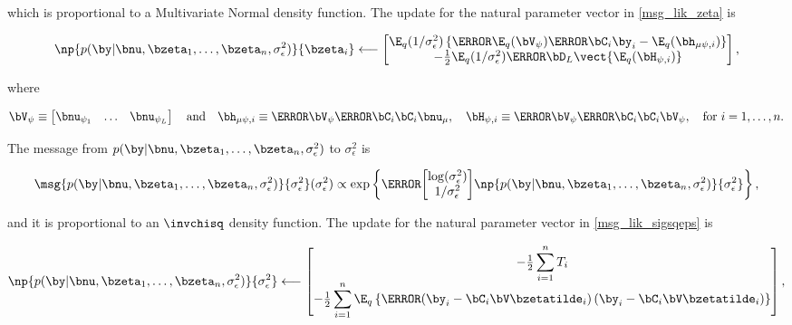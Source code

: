 \documentclass[12pt]{article}
\def\sigsqeps{\sigma^2_{\epsilon}}
\def\numu{\bnu_\mu}
\def\Vpsi{\bV_\psi}
\newcommand\nupsi[1]{\bnu_{\psi_{#1}}}
\newcommand\hmupsi[1]{\bh_{\mu \psi, i}}
\newcommand\Hpsi[1]{\bH_{\psi, i}}
\theoremstyle{plain}
\theoremstyle{definition}
\theoremstyle{remark}
\begin{document}
\noindent which is proportional to a Multivariate Normal density function.
The update for the natural parameter vector in \eqref{msg_lik_zeta} is

\begin{equation}
	\np{p (\by | \bnu, \bzeta_1, \dots, \bzeta_n, \sigsqeps)}{\bzeta_i}
		\longleftarrow
			\begin{bmatrix}
				\E_q (1/\sigsqeps) \left\{
					\T{\E_q (\Vpsi)} \T{\bC_i} \by_i - \E_q (\hmupsi{i})
				\right\} \\
				-\frac12 \E_q (1/\sigsqeps) \T{\bD_L} \vect \{ \E_q (\Hpsi{i}) \}
			\end{bmatrix},
\label{np_lik_zeta}
\end{equation}

\noindent where

\begin{equation}
	\Vpsi \equiv \begin{bmatrix}
		\nupsi{1} & \dots & \nupsi{L}
	\end{bmatrix} \quad
	\text{and} \quad
	\hmupsi{i} \equiv \T{\Vpsi} \T{\bC_i} \bC_i \numu, \quad
	\Hpsi{i} \equiv \T{\Vpsi} \T{\bC_i} \bC_i \Vpsi, \quad
	\text{for $i = 1, \dots, n$}.
\label{psi_related_defns}
\end{equation}

The message from $p (\by | \bnu, \bzeta_1, \dots, \bzeta_n, \sigsqeps)$ to $\sigsqeps$ is

\begin{equation}
	\msg{p (\by | \bnu, \bzeta_1, \dots, \bzeta_n, \sigsqeps)}{\sigsqeps} (\sigsqeps) \propto
		\exp \left\{
			\T{\begin{bmatrix}
				\log (\sigsqeps) \\
				1/\sigsqeps
			\end{bmatrix}}
			\np{p (\by | \bnu, \bzeta_1, \dots, \bzeta_n, \sigsqeps)}{\sigsqeps}
		\right\},
\label{msg_lik_sigsqeps}
\end{equation}

\noindent and it is proportional to an $\invchisq$ density function. The update for the natural parameter vector in
\eqref{msg_lik_sigsqeps} is

\begin{equation}
	\np{p (\by | \bnu, \bzeta_1, \dots, \bzeta_n, \sigsqeps)}{\sigsqeps}
		\longleftarrow
			\begin{bmatrix}
				-\frac12 \displaystyle\sum_{i=1}^n T_i \\
				-\frac12 \displaystyle\sum_{i=1}^n \E_q \left\{ \T{\left(
					\by_i - \bC_i \bV \bzetatilde_i
				\right)} \left(
					\by_i - \bC_i \bV \bzetatilde_i
				\right) \right\}
			\end{bmatrix},
\label{np_lik_sigsqeps}
\end{equation}
\end{document}
